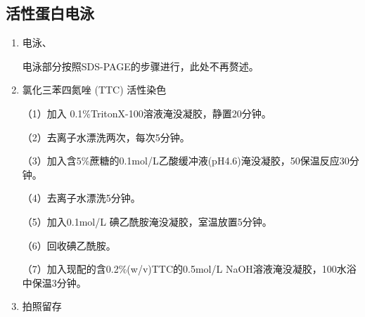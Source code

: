 \subsection{活性蛋白电泳}
\begin{enumerate}

    \item 电泳、

\hspace*{2em} 电泳部分按照SDS-PAGE的步骤进行，此处不再赘述。

    \item 氯化三苯四氮唑 (TTC) 活性染色
    
\hspace*{2em} （1）加入 0.1\%TritonX-100溶液淹没凝胶，静置20分钟。

\hspace*{2em} （2）去离子水漂洗两次，每次5分钟。

\hspace*{2em} （3）加入含5\%蔗糖的0.1mol/L乙酸缓冲液(pH4.6)淹没凝胶，50\dc 保温反应30分钟。

\hspace*{2em} （4）去离子水漂洗5分钟。

\hspace*{2em} （5）加入0.1mol/L 碘乙酰胺淹没凝胶，室温放置5分钟。

\hspace*{2em} （6）回收碘乙酰胺。

\hspace*{2em} （7）加入现配的含0.2\%(w/v)TTC的0.5mol/L NaOH溶液淹没凝胶，100\dc 水浴中保温3分钟。

    \item 拍照留存

\end{enumerate}


